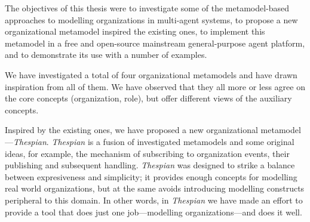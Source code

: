 


The objectives of this thesis were to investigate some of the metamodel-based approaches to modelling organizations in multi-agent systems, to propose a new organizational metamodel inspired the existing ones, to implement this metamodel in a free and open-source mainstream general-purpose agent platform, and to demonstrate its use with a number of examples. 

We have investigated a total of four organizational metamodels and have drawn inspiration from all of them.
We have observed that they all more or less agree on the core concepts (organization, role), but offer different views of the auxiliary concepts.

Inspired by the existing ones, we have proposed a new organizational metamodel---\textit{Thespian}.
\textit{Thespian} is a fusion of investigated metamodels and some original ideas, for example, the mechanism of subscribing to organization events, their publishing and subsequent handling.
\textit{Thespian} was designed to strike a balance between expresiveness and simplicity; it provides enough concepts for modelling real world organizations, but at the same avoids introducing modelling constructs peripheral to this domain.
In other words, in \textit{Thespian} we have made an effort to provide a tool that does just one job---modelling organizations---and does it well.

